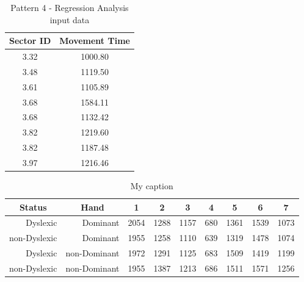 			\begin{table}[]
				\centering
				\caption{Pattern 4 - Regression Analysis input data}
				\label{tab_pat_4_reg}
				\begin{tabular}{|c|c|}
					\hline
					\textbf{Sector ID} & \textbf{Movement Time} \\ \hline
					3.32               & 1000.80                \\ \hline
					3.48               & 1119.50                \\ \hline
					3.61               & 1105.89                \\ \hline
					3.68               & 1584.11                \\ \hline
					3.68               & 1132.42                \\ \hline
					3.82               & 1219.60                \\ \hline
					3.82               & 1187.48                \\ \hline
					3.97               & 1216.46                \\ \hline
				\end{tabular}
			\end{table}
		
		\begin{table}[]
			\centering
			\caption{My caption}
			\label{tab_pat_3_mt}
			\begin{tabularx}{\textwidth}{|r|r|X|X|X|X|X|X|X|}
				\hline
				\multicolumn{1}{|c|}{\textbf{Status}} & \multicolumn{1}{c|}{\textbf{Hand}} & \multicolumn{1}{c|}{\textbf{1}} & \multicolumn{1}{c|}{\textbf{2}} & \multicolumn{1}{c|}{\textbf{3}} & \multicolumn{1}{c|}{\textbf{4}} & \multicolumn{1}{c|}{\textbf{5}} & \multicolumn{1}{c|}{\textbf{6}} & \multicolumn{1}{c|}{\textbf{7}} \\ \hline
				Dyslexic                              & Dominant                           & 2054       & 1288       & 1157       & 680        & 1361       & 1539       & 1073       \\ \hline
				non-Dyslexic                          & Dominant                           & 1955       & 1258       & 1110       & 639        & 1319       & 1478       & 1074       \\ \hline
				Dyslexic                              & non-Dominant                            & 1972       & 1291       & 1125       & 683        & 1509       & 1419       & 1199       \\ \hline
				non-Dyslexic                          & non-Dominant                            & 1955       & 1387       & 1213       & 686        & 1511       & 1571       & 1256       \\ \hline
			\end{tabularx}
		\end{table}
			
